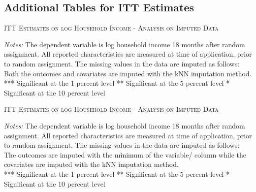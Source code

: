 \begin{appendices}
\newpage
\subsection*{Additional Tables for ITT Estimates} \label{appendix_itt_estimates}

\begin{table}[h!]
\centering
\caption{\textsc{ITT Estimates on log Household Income - Analysis on Imputed Data}}



\medskip
\begin{adjustbox}{width=0.825\textwidth, totalheight=\textheight, keepaspectratio}

\end{adjustbox}

\label{tab:table_kNN_withcontr}
\bigskip
\raggedright
\footnotesize
\textit{Notes:} The dependent variable is log household income 18 months after random assignment. All reported characteristics are measured at time of application, prior to random assignment. The missing values in the data are imputed as follows: Both the outcomes and covariates are imputed with the \ac{kNN} imputation method. \\
*** Significant at the 1 percent level ** Significant at the 5 percent level * Significant at the 10 percent level
\end{table}

\newpage
\begin{table}[h!]
\centering
\caption{\textsc{ITT Estimates on log Household Income - Analysis on Imputed Data}}



\medskip
\begin{adjustbox}{width=0.825\textwidth, totalheight=\textheight, keepaspectratio}

\end{adjustbox}

\label{tab:table_kNN_min_withcontr}
\bigskip
\raggedright
\footnotesize
\textit{Notes:} The dependent variable is log household income 18 months after random assignment. All reported characteristics are measured at time of application, prior to random assignment. The missing values in the data are imputed as follows: The outcomes are imputed with the minimum of the variable/ column while the covariates are imputed with the \ac{kNN} imputation method. \\
*** Significant at the 1 percent level ** Significant at the 5 percent level * Significant at the 10 percent level
\end{table}


\end{appendices}
